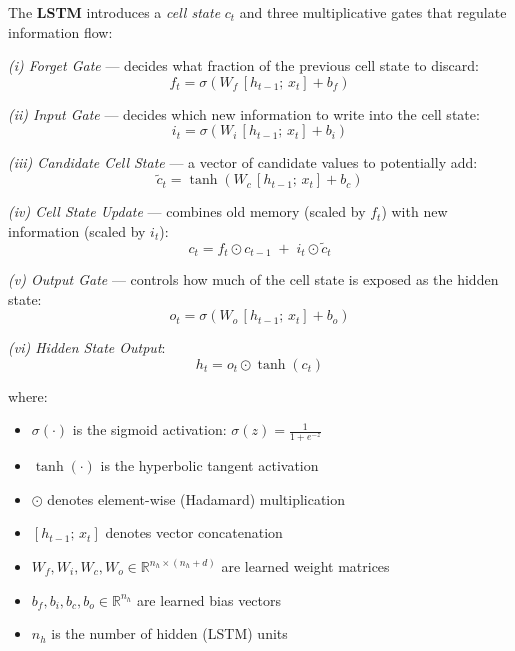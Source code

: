 \documentclass[12pt,a4paper]{article}
\begin{document}
The \textbf{LSTM} introduces a \emph{cell state} $c_t$ and three multiplicative
gates that regulate information flow:

\vspace{0.5em}
\noindent\textit{(i) Forget Gate} --- decides what fraction of the previous cell
state to discard:
\begin{equation}
    f_t = \sigma\!\left(W_f\,[h_{t-1};\,x_t] + b_f\right)
    \label{eq:forget}
\end{equation}

\noindent\textit{(ii) Input Gate} --- decides which new information to write into
the cell state:
\begin{equation}
    i_t = \sigma\!\left(W_i\,[h_{t-1};\,x_t] + b_i\right)
    \label{eq:input}
\end{equation}

\noindent\textit{(iii) Candidate Cell State} --- a vector of candidate values
to potentially add:
\begin{equation}
    \tilde{c}_t = \tanh\!\left(W_c\,[h_{t-1};\,x_t] + b_c\right)
    \label{eq:candidate}
\end{equation}

\noindent\textit{(iv) Cell State Update} --- combines old memory (scaled by
$f_t$) with new information (scaled by $i_t$):
\begin{equation}
    c_t = f_t \odot c_{t-1} \;+\; i_t \odot \tilde{c}_t
    \label{eq:cell}
\end{equation}

\noindent\textit{(v) Output Gate} --- controls how much of the cell state
is exposed as the hidden state:
\begin{equation}
    o_t = \sigma\!\left(W_o\,[h_{t-1};\,x_t] + b_o\right)
    \label{eq:output_gate}
\end{equation}

\noindent\textit{(vi) Hidden State Output}:
\begin{equation}
    h_t = o_t \odot \tanh(c_t)
    \label{eq:hidden}
\end{equation}

\noindent where:
\begin{itemize}
    \item $\sigma(\cdot)$ is the sigmoid activation: $\sigma(z)=\frac{1}{1+e^{-z}}$
    \item $\tanh(\cdot)$ is the hyperbolic tangent activation
    \item $\odot$ denotes element-wise (Hadamard) multiplication
    \item $[h_{t-1};\,x_t]$ denotes vector concatenation
    \item $W_f, W_i, W_c, W_o \in \mathbb{R}^{n_h \times (n_h + d)}$ are learned weight matrices
    \item $b_f, b_i, b_c, b_o \in \mathbb{R}^{n_h}$ are learned bias vectors
    \item $n_h$ is the number of hidden (LSTM) units
\end{itemize}
\end{document}
